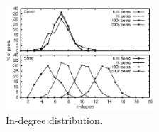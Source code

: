 \ \\

\begin{figure}
  \centering
  \includegraphics[width=0.49\textwidth]{img/histo.eps}
  \caption{\label{fig:histo}In-degree distribution.}
\end{figure}


